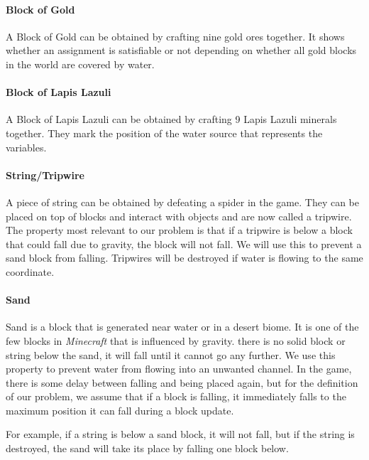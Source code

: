 \paragraph{Block of Gold}
A Block of Gold can be obtained by crafting nine gold ores together.
\newline It shows whether an assignment is satisfiable or not depending on whether all gold blocks in the world are covered by water.

\paragraph{Block of Lapis Lazuli}
A Block of Lapis Lazuli can be obtained by crafting 9 Lapis Lazuli minerals together.
They mark the position of the water source that represents the variables.

\paragraph{String/Tripwire}
A piece of string can be obtained by defeating a spider in the game.
They can be placed on top of blocks and interact with objects and are now called a tripwire.
The property most relevant to our problem is that if a tripwire is below a block that could fall due to gravity, the block will not fall.
We will use this to prevent a sand block from falling.
Tripwires will be destroyed if water is flowing to the same coordinate.

\paragraph{Sand}
Sand is a block that is generated near water or in a desert biome.
It is one of the few blocks in \textit{Minecraft} that is influenced by gravity.
 there is no solid block or string below the sand, it will fall until it cannot go any further.
We use this property to prevent water from flowing into an unwanted channel. In the game, there is some delay between falling and being placed again, but for the definition of our problem, we assume that if a block is falling, it immediately falls to the maximum position it can fall during a block update. 

\noindent \newline For example, if a string is below a sand block, it will not fall, but if the string is destroyed, the sand will take its place by falling one block below.

